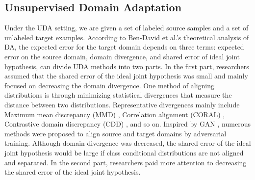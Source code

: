 \documentclass[a4paper,fleqn]{cas-dc}
\begin{document}
	\subsection{Unsupervised Domain Adaptation} 
	Under the UDA setting,  we are given a set of labeled source samples and a set of unlabeled target examples. According to Ben-David et al.'s \cite{DBLP:journals/ml/Ben-DavidBCKPV10} theoretical analysis of DA, the expected error for the target domain depends on three terms: expected error on the source domain, domain divergence, and shared error of ideal joint hypothesis, can divide UDA methods into two parts. In the first part, researchers assumed that the shared error of the ideal joint hypothesis was small and mainly focused on decreasing the domain divergence. One method of aligning distributions is through minimizing statistical divergences that measure the distance between two distributions. Representative divergences mainly include Maximum mean discrepancy (MMD) \cite{gretton2012kernel}, Correlation alignment (CORAL) \cite{sun2016return}, Contrastive domain discrepancy (CDD) \cite{kang2019contrastive}, and so on. Inspired by GAN \cite{goodfellow2014generative}, numerous methods \cite{ganin2014unsupervised,ganin2016domain,SunS16Deep,SanjayVariational,tzeng2014deep,sun2016return,shao2018feature,chen2020harmonizing,chen2021I3NET} were proposed  to align source and target domains by adversarial training. Although domain divergence was decreased, the shared error of the ideal joint hypothesis would be large if class conditional distributions are not aligned and separated. In the second part, researchers paid more attention to decreasing the shared error of the ideal joint hypothesis. 
	
\end{document}
